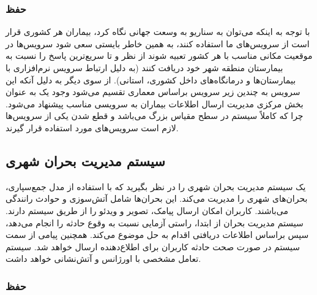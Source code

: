 \subsubsection*{حفظ }

با توجه به اینکه می‌توان به سناریو به وسعت جهانی نگاه کرد، بیماران هر کشوری قرار
است از سرویس‌های ما استفاده کنند، به همین خاطر بایستی سعی شود سرویس‌ها در موقعیت
مکانی مناسب با هر کشور تعبیه شوند از نظر  و  تا
سریع‌ترین پاسخ را نسبت به بیمارستان منطقه شهر خود دریافت کنند (به دلیل ارتباط
سرویس نرم‌افزاری با بیمارستان‌ها و درمانگاه‌های داخل کشوری، استانی). از سوی دیگر
به دلیل آنکه این سرویس به چندین زیر سرویس براساس معماری  تقسیم
می‌شود وجود یک  به عنوان بخش مرکزی مدیریت ارسال اطلاعات بیماران
به سرویسی مناسب پیشنهاد می‌شود. چرا که کاملاً سیستم در سطح مقیاس بزرگ می‌باشد و
قطع شدن یکی از سرویس‌ها لازم است سرویس‌های  مورد استفاده قرار گیرند.

\subsection{سیستم مدیریت بحران شهری}

یک سیستم مدیریت بحران شهری را در نظر بگیرید که با استفاده از مدل جمع‌سپاری،
بحران‌های شهری را مدیریت می‌کند. این بحران‌ها شامل آتش‌سوزی و حوادث رانندگی
می‌باشند. کاربران امکان ارسال پیامک، تصویر و ویدئو را از طریق سیستم دارند. سیستم
مدیریت بحران از ابتدا، راستی آزمایی نسبت به وقوع حادثه را انجام می‌دهد، سپس
براساس اطلاعات دریافتی اقدام به حل موضوع می‌کند. همچنین پیامی از سمت سیستم در
صورت صحت حادثه کاربران برای اطلاع‌دهنده ارسال خواهد شد. سیستم تعامل مشخصی با
اورژانس و آتش‌نشانی خواهد داشت.

\subsubsection*{حفظ }

